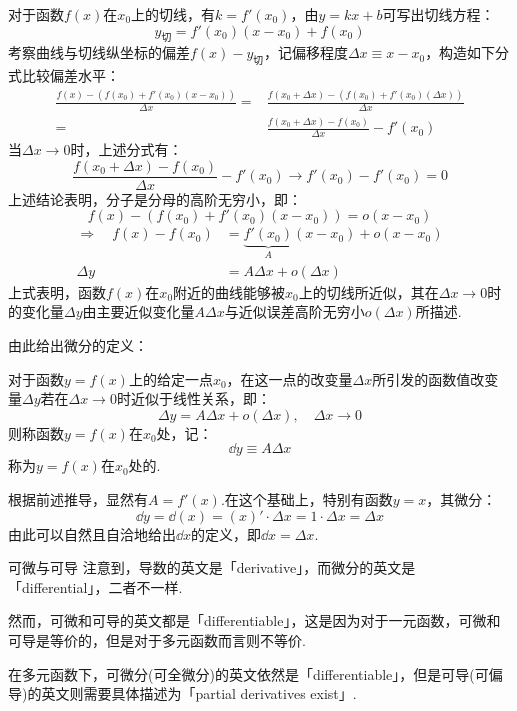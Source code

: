 对于函数$f(x)$在$x_0$上的切线，有$k = f'(x_0)$，由$y=kx+b$可写出切线方程：
\[y_\text{切} = f'(x_0)(x-x_0) + f(x_0)\]
考察曲线与切线纵坐标的偏差$f(x)-y_\text{切}$，记偏移程度$\Delta x \equiv x - x_0$，构造如下分式比较偏差水平：
\begin{align*}
    \frac{f(x)-(f(x_0)+f'(x_0)(x-x_0))}{\Delta x}
    =& \frac{f(x_0 + \Delta x)-(f(x_0)+f'(x_0)(\Delta x))}{\Delta x}\\
    =& \frac{f(x_0 + \Delta x)-f(x_0)}{\Delta x} - f'(x_0)
\end{align*}
当$\Delta x \to 0$时，上述分式有：
\[\frac{f(x_0 + \Delta x)-f(x_0)}{\Delta x} - f'(x_0) \to f'(x_0)-f'(x_0) = 0\]
上述结论表明，分子是分母的高阶无穷小，即：
\[f(x)-(f(x_0)+f'(x_0)(x-x_0)) = o(x-x_0)\]
\begin{align*}
\Rightarrow\quad f(x) - f(x_0) &= \underbrace{f'(x_0)}_{A}(x-x_0) + o(x-x_0)\\
\Delta y &= A \Delta x + o(\Delta x)
\end{align*}
上式表明，函数$f(x)$在$x_0$附近的曲线能够被$x_0$上的切线所近似，其在$\Delta x \to 0$时的变化量$\Delta y$由主要近似变化量$A\Delta x$与近似误差高阶无穷小$o(\Delta x)$所描述.

由此给出微分的定义：
\begin{definition}
    对于函数$y=f(x)$上的给定一点$x_0$，在这一点的改变量$\Delta x$所引发的函数值改变量$\Delta y$若在$\Delta x \to 0$时近似于线性关系，即：
    \[\Delta y = A\Delta x + o(\Delta x),\quad\Delta x \to 0\]
    则称函数$y=f(x)$在$x_0$处，记：
    \[\dd{y} \equiv A\Delta x\]
    称为$y=f(x)$在$x_0$处的.
\end{definition}

根据前述推导，显然有$A = f'(x)$.在这个基础上，特别有函数$y = x$，其微分：
\[\dd{y} = \dd{(x)} = (x)' \cdot \Delta x = 1 \cdot \Delta x = \Delta x\]
由此可以自然且自洽地给出$\dd{x}$的定义，即$\dd{x} = \Delta x$.

\begin{extension}{可微与可导}
    注意到，导数的英文是「derivative」，而微分的英文是「differential」，二者不一样.
    
    然而，可微和可导的英文都是「differentiable」，这是因为对于一元函数，可微和可导是等价的，但是对于多元函数而言则不等价.

    在多元函数下，可微分(可全微分)的英文依然是「differentiable」，但是可导(可偏导)的英文则需要具体描述为「partial derivatives exist」.
\end{extension}


